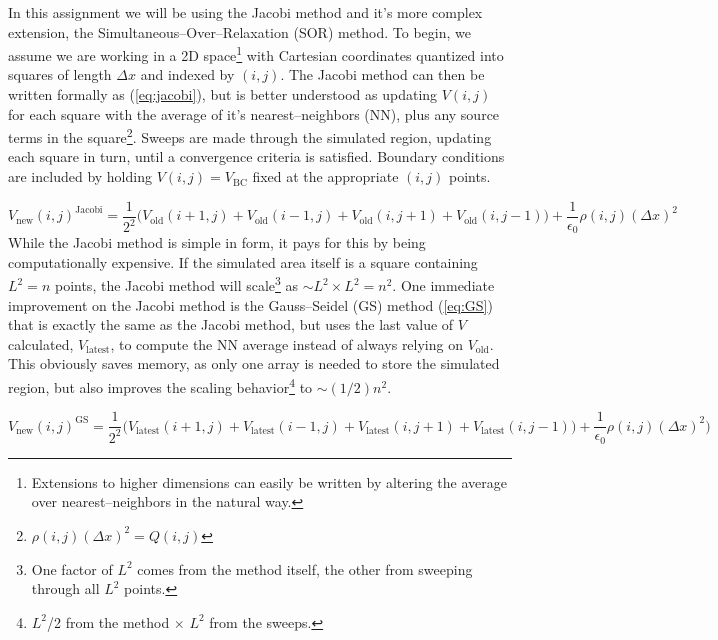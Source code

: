 \documentclass[notitlepage,aps,prd,nofootinbib]{revtex4-1}
\begin{document}
In this assignment we will be using the Jacobi method and it's more complex extension, the Simultaneous--Over--Relaxation (SOR) method. To begin, we assume we are working in a 2D space\footnote{Extensions to higher dimensions can easily be written by altering the average over nearest--neighbors in the natural way.} with Cartesian coordinates quantized into squares of length $\Delta x$ and indexed by $\left(i,j\right)$. The Jacobi method can then be written formally as (\ref{eq:jacobi}), but is better understood as updating $V\left(i,j\right)$ for each square with the average of it's nearest--neighbors (NN), plus any source terms in the square\footnote{$\rho\left(i,j\right)\left(\Delta x\right)^{2} = Q\left(i,j\right)$}. Sweeps are made through the simulated region, updating each square in turn, until a convergence criteria is satisfied. Boundary conditions are included by holding $V\left(i,j\right) = V_{\mathrm{BC}}$ fixed at the appropriate $\left(i,j\right)$ points.

\begin{equation} \label{eq:jacobi}
V_{\mathrm{new}}\left(i,j\right)^{\mathrm{Jacobi}} = \frac{1}{2^2}\big( V_{\mathrm{old}}\left(i+1,j\right) + V_{\mathrm{old}}\left(i-1,j\right) +V_{\mathrm{old}}\left(i,j+1\right) +V_{\mathrm{old}}\left(i,j-1\right) \big) + \frac{1}{\epsilon_{0}} \rho\left(i,j\right)\left(\Delta x\right)^{2}
\end{equation}
While the Jacobi method is simple in form, it pays for this by being computationally expensive. If the simulated area itself is a square containing $L^{2} = n$ points, the Jacobi method will scale\footnote{One factor of $L^{2}$ comes from the method itself, the other from sweeping through all $L^{2}$ points.} as $\sim L^{2} \times L^{2} = n^{2}$. One immediate improvement on the Jacobi method is the Gauss--Seidel (GS) method (\ref{eq:GS}) that is exactly the same as the Jacobi method, but uses the last value of $V$ calculated, $V_{\mathrm{latest}}$, to compute the NN average instead of always relying on $V_{\mathrm{old}}$. This obviously saves memory, as only one array is needed to store the simulated region, but also improves the scaling behavior\footnote{$L^{2}$/2 from the method $\times$ $L^{2}$ from the sweeps.} to $\sim (1/2)n^{2}$.

\begin{equation} \label{eq:GS}
V_{\mathrm{new}}\left(i,j\right)^{\mathrm{GS}} = \frac{1}{2^2}\big( V_{\mathrm{latest}}\left(i+1,j\right) + V_{\mathrm{latest}}\left(i-1,j\right) +V_{\mathrm{latest}}\left(i,j+1\right) +V_{\mathrm{latest}}\left(i,j-1\right) \big) + \frac{1}{\epsilon_{0}} \rho\left(i,j\right)\left(\Delta x\right)^{2}
)
\end{equation}
\end{document}
